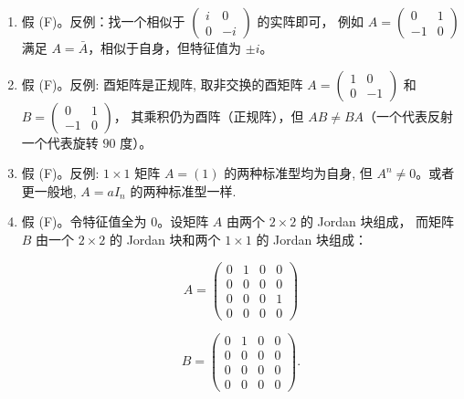 \begin{enumerate}
\item
  假 (F)。反例：找一个相似于
  \(\begin{pmatrix} i & 0 \\ 0 & -i \end{pmatrix}\) 的实阵即可，
  例如 \(A = \begin{pmatrix} 0 & 1 \\ -1 & 0 \end{pmatrix}\) 
  满足 \(A = \bar{A}\)，相似于自身，但特征值为 \(\pm i\)。
\item
  假 (F)。反例: 酉矩阵是正规阵, 取非交换的酉矩阵
  \(A = \begin{pmatrix} 1 & 0 \\ 0 & -1 \end{pmatrix}\) 和
  \(B = \begin{pmatrix} 0 & 1 \\ -1 & 0 \end{pmatrix}\)，
  其乘积仍为酉阵（正规阵），但 \(AB \neq BA\)（一个代表反射一个代表旋转 $90$ 度）。
\item
  假 (F)。反例: \(1 \times 1\) 矩阵 \(A = (1)\) 的两种标准型均为自身, 
  但 \(A^n \neq 0\)。或者更一般地, \(A = aI_n\) 的两种标准型一样.
\item
  假 (F)。令特征值全为 $0$。设矩阵 $A$ 由两个 \(2 \times 2\) 的 Jordan 块组成，
  而矩阵 \(B\) 由一个 \(2 \times 2\) 的 Jordan 块和两个 \(1 \times 1\) 的 Jordan 块组成：

\[A = \begin{pmatrix} 0 & 1 & 0 & 0 \\ 0 & 0 & 0 & 0 \\ 0 & 0 & 0 & 1 \\ 0 & 0 & 0 & 0 \end{pmatrix}\]

\[B = \begin{pmatrix} 0 & 1 & 0 & 0 \\ 0 & 0 & 0 & 0 \\ 0 & 0 & 0 & 0 \\ 0 & 0 & 0 & 0 \end{pmatrix}.\]


\end{enumerate}
